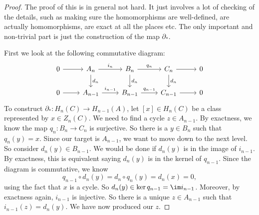 \documentclass[a4paper]{article}
\theoremstyle{definition}
\begin{document}
\begin{proof}
  The proof of this is in general not hard. It just involves a lot of checking of the details, such as making sure the homomorphisms are well-defined, are actually homomorphisms, are exact at all the places etc. The only important and non-trivial part is just the construction of the map $\partial_*$.

  First we look at the following commutative diagram:
  \[
    \begin{tikzcd}
      0 \ar[r] & A_n \ar[r, "i_n"] \ar[d, "d_n"] & B_n \ar[r, "q_n"] \ar[d, "d_n"] & C_n \ar[r] \ar[d, "d_n"] & 0\\
      0 \ar[r] & A_{n - 1} \ar[r, "i_{n - 1}"] & B_{n - 1} \ar[r, "q_{n - 1}"] & C_{n - 1} \ar[r] & 0
    \end{tikzcd}
  \]
  To construct $\partial_*: H_n(C) \to H_{n - 1}(A)$, let $[x] \in H_n(C)$ be a class represented by $x \in Z_n(C)$. We need to find a cycle $z \in A_{n - 1}$. By exactness, we know the map $q_n: B_n \to C_n$ is surjective. So there is a $y \in B_n$ such that $q_n(y) = x$. Since our target is $A_{n - 1}$, we want to move down to the next level. So consider $d_n(y) \in B_{n - 1}$. We would be done if $d_n(y)$ is in the image of $i_{n - 1}$. By exactness, this is equivalent saying $d_n(y)$ is in the kernel of $q_{n -1 }$. Since the diagram is commutative, we know
  \[
    q_{n - 1}\circ d_n(y) = d_n \circ q_n (y) = d_n(x) = 0,
  \]
  using the fact that $x$ is a cycle. So $d_n (y) \in \ker q_{n - 1} = \im i_{n - 1}$. Moreover, by exactness again, $i_{n - 1}$ is injective. So there is a unique $z \in A_{n - 1}$ such that $i_{n - 1}(z) = d_n(y)$. We have now produced our $z$.


\end{proof}
\end{document}
